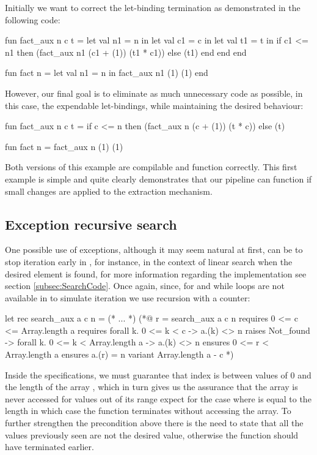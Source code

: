 Initially we want to correct the let-binding termination as demonstrated in the following code:

\begin{cakeml}
fun fact_aux n c t = let val n1 = n in
  let val c1 = c in
  let val t1 = t in
  if c1 <= n1 then (fact_aux n1 (c1 + (1)) (t1 * c1))  else (t1)
  end end end

fun fact n = let val n1 = n in fact_aux n1 (1) (1) end
\end{cakeml}

However, our final goal is to eliminate as much unnecessary code as possible, in this case, the expendable let-bindings, while 
maintaining the desired behaviour:

\begin{cakeml}
fun fact_aux n c t = 
  if c <= n then (fact_aux n (c + (1)) (t * c))  else (t)

fun fact n = fact_aux n (1) (1)
\end{cakeml}

Both versions of this example are compilable and function correctly. This first example is simple and quite clearly demonstrates that
our pipeline can function if small changes are applied to the extraction mechanism.

\subsection{Exception recursive search}

One possible use of exceptions, although it may seem natural at first, can be to stop iteration early in \ocaml, for instance, in the 
context of linear search when the desired element is found, for more information regarding the implementation see section 
\ref{subsec:SearchCode}. Once again, since, for and while loops are not available in \cml to simulate iteration we use recursion 
with a counter:

\begin{gospell}
let rec search_aux a c n = (* ... *)
(*@
  r = search_aux a c n
  requires 0 <= c <= Array.length a
  requires forall k. 0 <= k < c -> a.(k) <> n
  raises Not_found -> forall k. 0 <= k < Array.length a -> a.(k) <> n
  ensures 0 <= r < Array.length a
  ensures a.(r) = n
  variant Array.length a - c
*)
\end{gospell}

Inside the \gospel specifications, we must guarantee that index  is between values of 0 and the length of the array 
, which in turn gives us the assurance that the array is never accessed for values out of its range expect for the case 
where  is equal to the length in which case the function terminates without accessing the array. To further strengthen the
precondition above there is the need to state that all the values previously seen are not the desired value, otherwise the function
should have terminated earlier.

